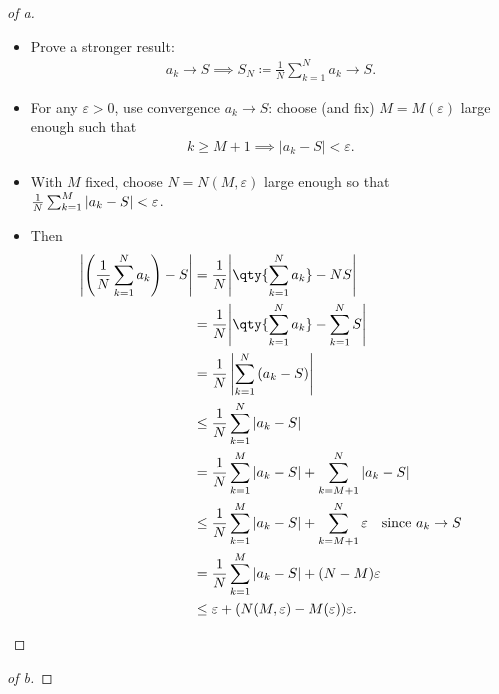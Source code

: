 \begin{solution}
\begin{proof}[of a]
\begin{itemize}
\item
  Prove a stronger result:
  \begin{align*}
  a_k \to S \implies S_N\coloneqq\frac 1 N \sum_{k=1}^N a_k \to S
  .\end{align*}
\item
  For any \({\varepsilon}> 0\), use convergence \(a_k \to S\): choose
  (and fix) \(M = M({\varepsilon})\) large enough such that
  \begin{align*}
  k\geq M+1 \implies {\left\lvert {a_k - S} \right\rvert} < \varepsilon
  .\end{align*}
\item
  With \(M\) fixed, choose \(N = N(M, {\varepsilon})\) large enough so
  that
  \({1\over N} \sum_{k=1}^{M} {\left\lvert {a_k - S} \right\rvert} < {\varepsilon}\).
\item
  Then
  \begin{align*}
  \left|\left(\frac{1}{N} \sum_{k=1}^{N} a_{k}\right)-S\right| 
  &= {1\over N} {\left\lvert { \qty{\sum_{k=1}^N a_k} - NS  } \right\rvert} \\
  &= {1\over N} {\left\lvert { \qty{\sum_{k=1}^N a_k} - \sum_{k=1}^N S  } \right\rvert} \\
  &=\frac{1}{N}\left|\sum_{k=1}^{N}\left(a_{k}-S\right)\right| \\
  &\leq \frac{1}{N} \sum_{k=1}^{N}\left|a_{k}-S\right| \\
  &= {1\over N} \sum_{k=1}^{M} {\left\lvert {a_k - S} \right\rvert} + \sum_{k=M+1}^N {\left\lvert {a_k - S} \right\rvert} \\
  &\leq {1\over N} \sum_{k=1}^{M} {\left\lvert {a_k - S} \right\rvert} + \sum_{k=M+1}^N {{\varepsilon}} \quad \text{since } a_k \to S\\
  &= {1\over N} \sum_{k=1}^{M} {\left\lvert {a_k - S} \right\rvert} + (N - M){{\varepsilon}} \\
  &\leq {\varepsilon}+ (N(M, {\varepsilon}) - M({\varepsilon})){\varepsilon}
  .\end{align*}
\end{itemize}

\end{proof}


\begin{proof}[of b]

\envlist


\end{proof}
\end{solution}
